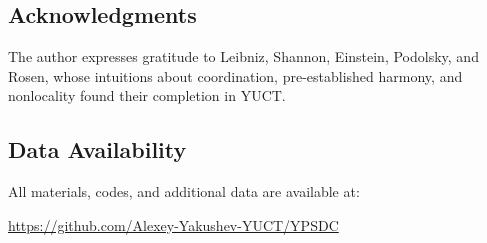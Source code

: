 \documentclass[12pt,a4paper]{article}
\begin{document}
	\subsection*{Acknowledgments}
	
	The author expresses gratitude to Leibniz, Shannon, Einstein, Podolsky, and Rosen, whose intuitions about coordination, pre-established harmony, and nonlocality found their completion in YUCT.
	
	\subsection*{Data Availability}
	
	All materials, codes, and additional data are available at:
	\begin{center}
		\url{https://github.com/Alexey-Yakushev-YUCT/YPSDC}
	\end{center}
	
\end{document}
